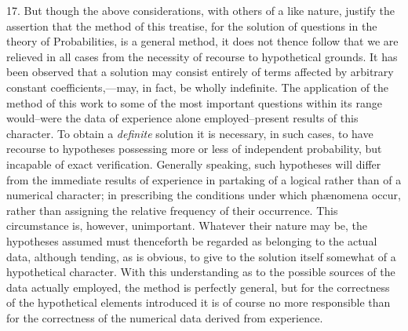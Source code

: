 \documentclass[oneside]{book}
\begin{document}
17. But though the above considerations, with others of a
like nature, justify the assertion that the method of this treatise,
for the solution of questions in the theory of Probabilities, is a
general method, it does not thence follow that we are relieved in
all cases from the necessity of recourse to hypothetical grounds.
It has been observed that a solution may consist entirely of terms
affected by arbitrary constant coefficients,---may, in fact, be
wholly indefinite. The application of the method of this work to
some of the most important questions within its range would--were
the data of experience alone employed--present results of
this character. To obtain a \textit{definite} solution it is necessary, in
such cases, to have recourse to hypotheses possessing more or less
of independent probability, but incapable of exact verification.
Generally speaking, such hypotheses will differ from the immediate
results of experience in partaking of a logical rather than of a
numerical character; in prescribing the conditions under which
ph{\ae}nomena occur, rather than assigning the relative frequency
of their occurrence. This circumstance is, however, unimportant.
Whatever their nature may be, the hypotheses assumed must
thenceforth be regarded as belonging to the actual data, although
tending, as is obvious, to give to the solution itself somewhat of
a hypothetical character. With this understanding as to the
possible sources of the data actually employed, the method is
perfectly general, but for the correctness of the hypothetical elements
introduced it is of course no more responsible than for the
correctness of the numerical data derived from experience.
\end{document}
